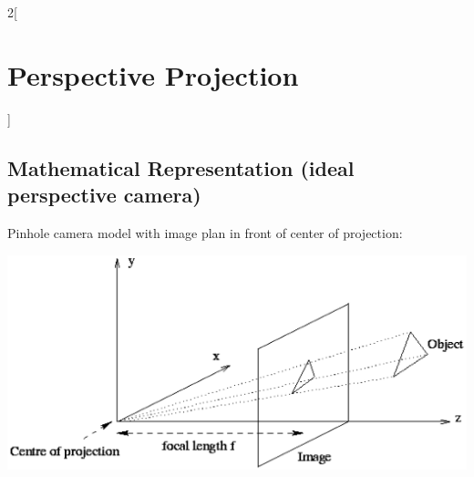 \documentclass[oneside,fontsize=11pt,paper=a4]{scrartcl}
\newenvironment{myfigure}
  {\par\medskip\noindent\minipage{\linewidth}}
  {\endminipage\par\medskip}
\begin{document}
\begin{multicols}{2}[\section{Perspective Projection}]
\subsection{Mathematical Representation (ideal perspective camera)}
Pinhole camera model with image plan in front of center of projection:
\begin{myfigure}
 \centering
 \includegraphics[width=1\linewidth]{Images/lochkameramodell_positivlage.PNG}
\end{myfigure}


\end{multicols}
\end{document}
